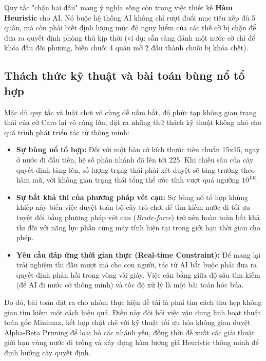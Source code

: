 Quy tắc "chặn hai đầu" mang ý nghĩa sống còn trong việc thiết kế \textbf{Hàm Heuristic} cho AI. Nó buộc hệ thống AI không chỉ rượt đuổi mục tiêu xếp đủ 5 quân, mà còn phải biết định lượng mức độ nguy hiểm của các thế cờ bị chặn để đưa ra quyết định phòng thủ kịp thời (ví dụ: sẵn sàng đánh một nước cờ chỉ để khóa đầu đối phương, biến chuỗi 4 quân mở 2 đầu thành chuỗi bị khóa chết).

\subsection{Thách thức kỹ thuật và bài toán bùng nổ tổ hợp}

Mặc dù quy tắc và luật chơi vô cùng dễ nắm bắt, độ phức tạp không gian trạng thái của cờ Caro lại vô cùng lớn, đặt ra những thử thách kỹ thuật không nhỏ cho quá trình phát triển tác tử thông minh:

\begin{itemize}
	\item \textbf{Sự bùng nổ tổ hợp:} Đối với một bàn cờ kích thước tiêu chuẩn 15x15, ngay ở nước đi đầu tiên, hệ số phân nhánh đã lên tới 225. Khi chiều sâu của cây quyết định tăng lên, số lượng trạng thái phải xét duyệt sẽ tăng trưởng theo hàm mũ, với không gian trạng thái tổng thể ước tính vượt quá ngưỡng $10^{105}$.
	
	\item \textbf{Sự bất khả thi của phương pháp vét cạn:} Sự bùng nổ tổ hợp khủng khiếp này biến việc duyệt toàn bộ cây trò chơi để tìm kiếm nước đi tối ưu tuyệt đối bằng phương pháp vét cạn (\textit{Brute-force}) trở nên hoàn toàn bất khả thi đối với năng lực phần cứng máy tính hiện tại trong giới hạn thời gian cho phép.
	
	\item \textbf{Yêu cầu đáp ứng thời gian thực (Real-time Constraint):} Để mang lại trải nghiệm thi đấu mượt mà cho con người, tác tử AI bắt buộc phải đưa ra quyết định phản hồi trong vòng vài giây. Việc cân bằng giữa độ sâu tìm kiếm (để AI đi nước cờ thông minh) và tốc độ xử lý là một bài toán hóc búa.
\end{itemize}

Do đó, bài toán đặt ra cho nhóm thực hiện đề tài là phải tìm cách thu hẹp không gian tìm kiếm một cách hiệu quả. Điều này đòi hỏi việc vận dụng linh hoạt thuật toán gốc Minimax, kết hợp chặt chẽ với kỹ thuật tối ưu hóa không gian duyệt Alpha-Beta Pruning để loại bỏ các nhánh yếu, đồng thời đề xuất các giải thuật giới hạn vùng nước đi trống và xây dựng hàm lượng giá Heuristic thông minh để định hướng cây quyết định.

